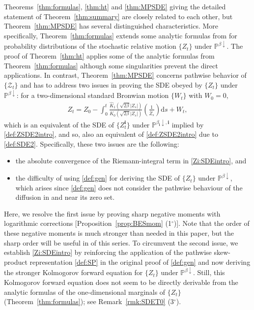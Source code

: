 \documentclass[12pt, twoside]{article}
\numberwithin{figure}{section}
\newcommand{\1}{\mathds 1}
\newcommand{\da}{{\downarrow}}
\newcommand{\ms}{\mathscr}
\renewcommand{\P}{{\mathbb P}}
\renewcommand{\d}{{\mathrm d}}
\newcommand{\2}{{\mathbf 1}}
\newcommand{\cc}{{^\circ}}
\newcommand{\bi}{\mathbf i}
\newcommand{\hK}{{\widehat{K}}}
\begin{document}
Theorems~\ref{thm:formulas}, \ref{thm:ht} and \ref{thm:MPSDE} giving the detailed statement of Theorem~\ref{thm:summary} are closely related to each other, but Theorem~\ref{thm:MPSDE} has several distinguished characteristics. More specifically,  Theorem~\ref{thm:formulas} extends some analytic formulas from \cite{C:BES} for probability distributions of the stochastic relative motion $\{Z_t\}$ under $\P^{\beta\da}$. The proof of Theorem~\ref{thm:ht} applies some of the analytic formulas from Theorem~\ref{thm:formulas} although some singularities prevent the direct applications. In contrast, Theorem~\ref{thm:MPSDE} concerns pathwise behavior of $\{\ms Z_t\}$ and has to address two issues in proving the SDE obeyed by $\{Z_t\}$ under $\P^{\beta\da}$: for a two-dimensional standard Bronwian motion $\{W_t\}$ with $W_0=0$, 
\begin{align}\label{Zi:SDEintro}
Z_t=Z_0-\int_0^t \frac{\hK_1(\sqrt{2\beta}|Z_s|)}{K_0(\sqrt{2\beta}|Z_s|)}\left(\frac{1}{\overline{Z}_s}\right)\d s+W_t,
\end{align}
which is an equivalent of the SDE of $\{Z^\bi_t\}$ under $\P^{\beta_\bi\da,\bi}$ implied by \eqref{def:ZSDE2intro}, and so,
also an equivalent of \eqref{def:ZSDE2intro} due to \eqref{def:SDE2}. 
Specifically, these two issues are the following:
\begin{itemize}
\item the absolute convergence of the Riemann-integral term in \eqref{Zi:SDEintro}, and
\item the difficulty of using \eqref{def:gen} for deriving the SDE of $\{Z_t\}$ under $\P^{\beta\da}$, which arises since  \eqref{def:gen} does not consider the pathwise behaviour of the diffusion in and near its zero set.
\end{itemize}
Here, we resolve the first issue by proving sharp negative moments with logarithmic corrections [Proposition~\ref{prop:BESmom} (1$\cc$)]. Note that the order of these negative moments is much stronger than needed in this paper, but the sharp order will be useful in \cite{C:SDBG2} of this series. To circumvent the second issue, we establish \eqref{Zi:SDEintro} by reinforcing the application of the pathwise skew-product representation \eqref{def:SP} in the original proof of \eqref{def:gen} \cite[Proposition~2.8]{C:BES} and now deriving the stronger Kolmogorov forward equation for $\{Z_t\}$ under $\P^{\beta\da}$. 
Still, this Kolmogorov forward equation does not seem to be directly derivable from the analytic formulas of the one-dimensional marginals of $\{Z_t\}$ (Theorem~\ref{thm:formulas}); see Remark~\ref{rmk:SDET0} (3$\cc$). 
\end{document}
